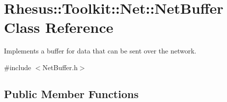 \hypertarget{class_rhesus_1_1_toolkit_1_1_net_1_1_net_buffer}{\section{Rhesus\-:\-:Toolkit\-:\-:Net\-:\-:Net\-Buffer Class Reference}
\label{class_rhesus_1_1_toolkit_1_1_net_1_1_net_buffer}
}


Implements a buffer for data that can be sent over the network.  




{\ttfamily \#include $<$Net\-Buffer.\-h$>$}

\subsection*{Public Member Functions}
